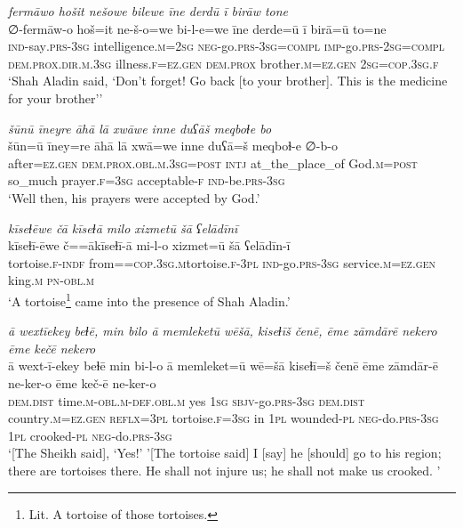 \ea \label{DG.56}
\textit{fermāwo hošit nešowe bilewe īne derdū ī birāw tone} \\ 
\gll ∅-fermāw-o hoš=it ne-š-o=we bi-l-e=we īne derde=ū ī birā=ū to=ne \\ 
 \textsc{ind-}say\textsc{.prs}\textsc{-3sg} intelligence\textsc{.m}\textsc{=\textsc{2sg}} \textsc{neg-}go\textsc{.prs}\textsc{-3sg}\textsc{=\textsc{compl}} \textsc{imp-}go\textsc{.prs}-\textsc{2sg}\textsc{=compl} \textsc{dem.prox}\textsc{.dir}\textsc{.m}\textsc{.3sg} illness\textsc{\textsc{.f}}\textsc{=ez}\textsc{.gen} \textsc{dem.prox} brother\textsc{.m}\textsc{=ez}\textsc{.gen} \textsc{2sg}\textsc{=cop}\textsc{.3sg}\textsc{\textsc{.f}} \\ 
\glt `Shah Aladin said, ‘Don’t forget! Go back [to your brother]. This is the medicine for your brother’'
\z 
 
\ea \label{DG.60}
\textit{šūnū īneyre āhā lā xwāwe inne duʕāš meqboɫe bo} \\ 
\gll šūn=ū īney=re āhā lā xwā=we inne duʕā=š meqboɫ-e ∅-b-o \\ 
 after\textsc{=ez}\textsc{.gen} \textsc{dem.prox}\textsc{.obl}\textsc{.m}\textsc{.3sg}\textsc{=\textsc{post}} \textsc{intj} at\_the\_place\_of God\textsc{.m}\textsc{=\textsc{post}} so\_much prayer\textsc{\textsc{.f}}\textsc{=3sg} acceptable\textsc{-f} \textsc{ind-}be\textsc{.prs}\textsc{-3sg} \\ 
\glt `Well then, his prayers were accepted by God.'
\z 
 
\ea \label{DG.61}
\textit{kīseɫēwe čā kīseɫā milo xizmetū šā ʕelādīnī} \\ 
\gll kīseɫī-ēwe č==ākīseɫī-ā mi-l-o xizmet=ū šā ʕelādīn-ī \\ 
 tortoise\textsc{\textsc{.f}}\textsc{-indf} from=\textsc{=cop}\textsc{.3sg}\textsc{.m}tortoise\textsc{\textsc{.f}}\textsc{-3pl} \textsc{ind-}go\textsc{.prs}\textsc{-3sg} service\textsc{.m}\textsc{=ez}\textsc{.gen} king\textsc{.m} \textsc{pn}\textsc{-obl}\textsc{.m} \\ 
\glt `A tortoise\footnote{Lit. A tortoise of those tortoises.}  came into the presence of Shah Aladin.'
\z 
 
\ea \label{DG.64}
\textit{ā wextīekey beɫē, min bilo ā memleketū wēšā, kiseɫīš čenē, ēme zāmdārē nekero ēme kečē nekero} \\ 
\gll ā wext-ī-ekey beɫē min bi-l-o ā memleket=ū wē=šā kiseɫī=š čenē ēme zāmdār-ē ne-ker-o ēme keč-ē ne-ker-o \\ 
 \textsc{dem.dist} time\textsc{.m}\textsc{-obl}\textsc{.m}\textsc{-def}\textsc{.obl}\textsc{.m} yes \textsc{1sg} \textsc{sbjv-}go\textsc{.prs}\textsc{-3sg} \textsc{dem.dist} country\textsc{.m}\textsc{=ez}\textsc{.gen} \textsc{reflx}\textsc{=3pl} tortoise\textsc{\textsc{.f}}\textsc{=3sg} in \textsc{1pl} wounded\textsc{\textsc{-pl}} \textsc{neg-}do\textsc{.prs}\textsc{-3sg} \textsc{1pl} crooked\textsc{\textsc{-pl}} \textsc{neg-}do\textsc{.prs}\textsc{-3sg} \\ 
\glt `[The Sheikh said], ‘Yes!' '[The tortoise said] I [say] he [should] go to his region; there are tortoises there. He shall not injure us; he shall not make us crooked. '
\z 
 
